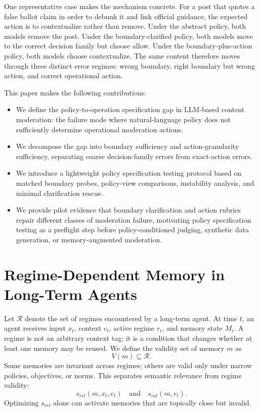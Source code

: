 \documentclass{article} %
\begin{document}
One representative case makes the mechanism concrete. For a post that quotes a
false ballot claim in order to debunk it and link official guidance, the
expected action is to contextualize rather than remove. Under the abstract
policy, both models remove the post. Under the boundary-clarified policy, both
models move to the correct decision family but choose allow. Under the
boundary-plus-action policy, both models choose contextualize. The same content
therefore moves through three distinct error regimes: wrong boundary, right
boundary but wrong action, and correct operational action.

This paper makes the following contributions:
\begin{itemize}
    \item We define the policy-to-operation specification gap in LLM-based
    content moderation: the failure mode where natural-language policy does not
    sufficiently determine operational moderation actions.
    \item We decompose the gap into boundary sufficiency and action-granularity
    sufficiency, separating coarse decision-family errors from exact-action
    errors.
    \item We introduce a lightweight policy specification testing protocol based
    on matched boundary probes, policy-view comparisons, instability analysis,
    and minimal clarification rescue.
    \item We provide pilot evidence that boundary clarification and action
    rubrics repair different classes of moderation failure, motivating policy
    specification testing as a preflight step before policy-conditioned judging,
    synthetic data generation, or memory-augmented moderation.
\end{itemize}

\section{Regime-Dependent Memory in Long-Term Agents}
\label{sec:problem_formulation}

Let $\mathcal{R}$ denote the set of regimes encountered by a long-term agent.
At time $t$, an agent receives input $x_t$, context $c_t$, active regime $r_t$, and memory state $M_t$.
A regime is not an arbitrary context tag: it is a condition that changes whether at least one memory may be reused.
We define the validity set of memory $m$ as
\begin{equation}
    V(m) \subseteq \mathcal{R}.
\end{equation}
Some memories are invariant across regimes; others are valid only under narrow policies, objectives, or norms.
This separates semantic relevance from regime validity:
\begin{equation}
    s_{rel}(m, x_t, c_t)
    \quad \text{and} \quad
    s_{val}(m, r_t).
\end{equation}
Optimizing $s_{rel}$ alone can activate memories that are topically close but invalid.
\end{document}
